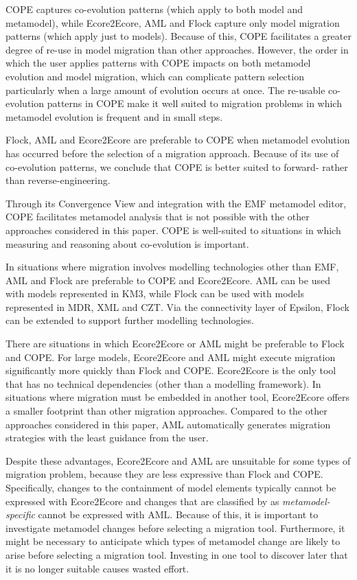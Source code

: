 COPE captures co-evolution patterns (which apply to both model and metamodel), while Ecore2Ecore, AML and Flock capture only model migration patterns (which apply just to models). Because of this, COPE facilitates a greater degree of re-use in model migration than other approaches. However, the order in which the user applies patterns with COPE impacts on both metamodel evolution and model migration, which can complicate pattern selection particularly when a large amount of evolution occurs at once. The re-usable co-evolution patterns in COPE make it well suited to migration problems in which metamodel evolution is frequent and in small steps.

Flock, AML and Ecore2Ecore are preferable to COPE when metamodel evolution has occurred before the selection of a migration approach. Because of its use of co-evolution patterns, we conclude that COPE is better suited to forward- rather than reverse-engineering.

Through its Convergence View and integration with the EMF metamodel editor, COPE facilitates metamodel analysis that is not possible with the other approaches considered in this paper. COPE is well-suited to situations in which measuring and reasoning about co-evolution is important.

In situations where migration involves modelling technologies other than EMF, AML and Flock are preferable to COPE and Ecore2Ecore. AML can be used with models represented in KM3, while Flock can be used with models represented in MDR, XML and CZT. Via the connectivity layer of Epsilon, Flock can be extended to support further modelling technologies.

There are situations in which Ecore2Ecore or AML might be preferable to Flock and COPE. For large models, Ecore2Ecore and AML might execute migration significantly more quickly than Flock and COPE. Ecore2Ecore is the only tool that has no technical dependencies (other than a modelling framework). In situations where migration must be embedded in another tool, Ecore2Ecore offers a smaller footprint than other migration approaches. Compared to the other approaches considered in this paper, AML automatically generates migration strategies with the least guidance from the user.

Despite these advantages, Ecore2Ecore and AML are unsuitable for some types of migration problem, because they are less expressive than Flock and COPE. Specifically, changes to the containment of model elements typically cannot be expressed with Ecore2Ecore and changes that are classified by %
\cite{herrmannsdoerfer08automatability} as \emph{metamodel-specific}
cannot be expressed with AML. Because of this, it is important to investigate metamodel changes before selecting a migration tool. Furthermore, it might be necessary to anticipate which types of metamodel change are likely to arise before selecting a migration tool. Investing in one tool to discover later that it is no longer suitable causes wasted effort.

